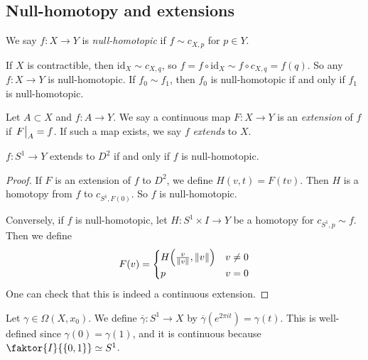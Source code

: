 \subsection{Null-homotopy and extensions}
\begin{definition}
	We say \( f \colon X \to Y \) is \emph{null-homotopic} if \( f \sim c_{X,p} \) for \( p \in Y \).
\end{definition}
\begin{example}
	If \( X \) is contractible, then \( \mathrm{id}_X \sim c_{X,q} \), so \( f = f \circ \mathrm{id}_X \sim f \circ c_{X,q} = f(q) \).
	So any \( f \colon X \to Y \) is null-homotopic.
	If \( f_0 \sim f_1 \), then \( f_0 \) is null-homotopic if and only if \( f_1 \) is null-homotopic.
\end{example}
\begin{definition}
	Let \( A \subset X \) and \( f \colon A \to Y \).
	We say a continuous map \( F \colon X \to Y \) is an \emph{extension} of \( f \) if \( \eval{F}_A = f \).
	If such a map exists, we say \( f \) \emph{extends} to \( X \).
	\begin{center}
	\end{center}
\end{definition}
\begin{lemma}
	\( f \colon S^1 \to Y \) extends to \( D^2 \) if and only if \( f \) is null-homotopic.
\end{lemma}
\begin{proof}
	If \( F \) is an extension of \( f \) to \( D^2 \), we define \( H(v,t) = F(tv) \).
	Then \( H \) is a homotopy from \( f \) to \( c_{S^1, F(0)} \).
	So \( f \) is null-homotopic.

	Conversely, if \( f \) is null-homotopic, let \( H \colon S^1 \times I \to Y \) be a homotopy for \( c_{S^1, p} \sim f \).
	Then we define
	\[ F(v) = \begin{cases}
		H\qty(\frac{v}{\norm{v}}, \norm{v}) & v \neq 0 \\
		p & v = 0
	\end{cases} \]
	One can check that this is indeed a continuous extension.
\end{proof}
\begin{definition}
	Let \( \gamma \in \Omega(X,x_0) \).
	We define \( \overline \gamma \colon S^1 \to X \) by \( \overline\gamma(e^{2\pi i t}) = \gamma(t) \).
	This is well-defined since \( \gamma(0) = \gamma(1) \), and it is continuous because \( \faktor{I}{\qty{0,1}} \simeq S^1 \).
\end{definition}

